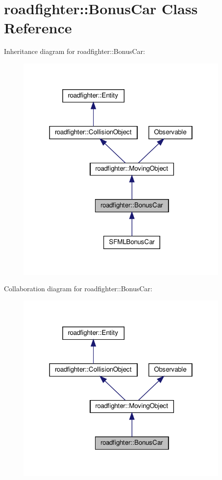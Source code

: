 \hypertarget{classroadfighter_1_1BonusCar}{}\section{roadfighter\+:\+:Bonus\+Car Class Reference}
\label{classroadfighter_1_1BonusCar}


Inheritance diagram for roadfighter\+:\+:Bonus\+Car\+:\nopagebreak
\begin{figure}[H]
\begin{center}
\leavevmode
\includegraphics[width=298pt]{classroadfighter_1_1BonusCar__inherit__graph}
\end{center}
\end{figure}


Collaboration diagram for roadfighter\+:\+:Bonus\+Car\+:\nopagebreak
\begin{figure}[H]
\begin{center}
\leavevmode
\includegraphics[width=298pt]{classroadfighter_1_1BonusCar__coll__graph}
\end{center}
\end{figure}
